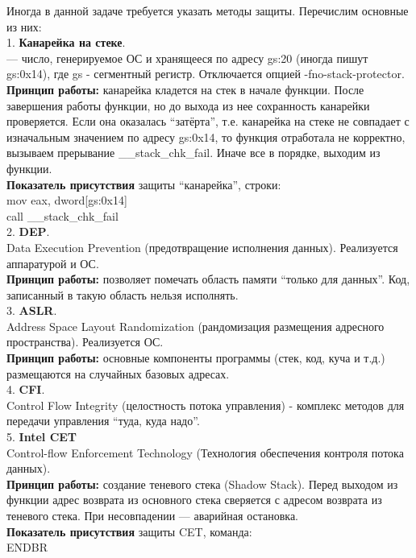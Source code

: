 \documentclass[12pt, letterpaper]{article}
\begin{document}
Иногда в данной задаче требуется указать методы защиты. Перечислим основные из них:\\
1. \textbf{Канарейка на стеке}.\\
 — число, генерируемое ОС и хранящееся по адресу gs:20 (иногда пишут gs:0x14), где gs - сегментный регистр. Отключается опцией -fno-stack-protector.\\
\indent\textbf{Принцип работы:} канарейка кладется на стек в начале функции. После завершения работы функции, но до выхода из нее сохранность канарейки проверяется. Если она оказалась ``затёрта'', т.е. канарейка на стеке не совпадает с изначальным значением по адресу gs:0x14, то функция отработала не корректно, вызываем прерывание \_\_stack\_chk\_fail. Иначе все в порядке, выходим из функции.\\
\indent\textbf{Показатель присутствия} защиты ``канарейка'', строки:\\
mov eax, dword[gs:0x14]\\
call \_\_stack\_chk\_fail\\
2. \textbf{DEP}.\\
\indent Data Execution Prevention (предотвращение исполнения данных). Реализуется аппаратурой и ОС.\\
\indent \textbf{Принцип работы:} позволяет помечать область памяти ``только для данных''. Код, записанный в такую область нельзя исполнять.\\
3. \textbf{ASLR}.\\
\indent Address Space Layout Randomization (рандомизация размещения адресного пространства). Реализуется ОС.\\
\indent \textbf{Принцип работы:} основные компоненты программы (стек, код, куча и т.д.) размещаются на случайных базовых адресах.\\
4. \textbf{CFI}.\\
\indent Control Flow Integrity (целостность потока управления) - комплекс методов для передачи управления ``туда, куда надо''.\\
5. \textbf{Intel CET}\\
\indent Control-flow Enforcement Technology (Технология обеспечения контроля потока данных).\\
\indent \textbf{Принцип работы:} создание теневого стека (Shadow Stack). Перед выходом из функции адрес возврата из основного стека сверяется с адресом возврата из теневого стека. При несовпадении — аварийная остановка.\\
\indent \textbf{Показатель присутствия} защиты CET, команда:\\
ENDBR
\newpage
\end{document}
